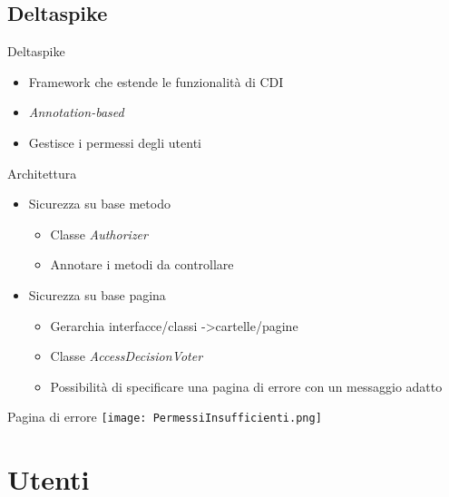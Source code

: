 \subsection{Deltaspike}

\begin{frame}{Deltaspike}
\begin{itemize}
\item Framework che estende le funzionalità di CDI
\vspace{0.8em}
\item \textsl{Annotation-based}
\vspace{0.8em}
\item Gestisce i permessi degli utenti
\end{itemize}
\end{frame}

\begin{frame}{Architettura}
\begin{itemize}
\item Sicurezza su base metodo
	\begin{itemize}
	\item Classe \textsl{Authorizer}
	\vspace{0.8em}
	\item Annotare i metodi da controllare
	\end{itemize}
\vspace{0.8em}
\item Sicurezza su base pagina
	\begin{itemize}
	\item Gerarchia interfacce/classi -\textgreater  cartelle/pagine
	\vspace{0.8em}
	\item Classe \textsl{AccessDecisionVoter}
	\vspace{0.8em}
	\item Possibilità di specificare una pagina di errore con un messaggio adatto
	\end{itemize}
\end{itemize}

\end{frame}

\begin{frame}{Pagina di errore}
\centering
	\texttt{[image: PermessiInsufficienti.png]}
\end{frame}

\section{Utenti}
